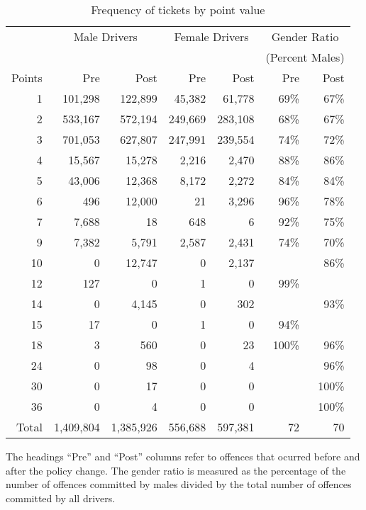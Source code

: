 
\begin{table}%
\centering
\begin{tabular}{r r r r r r r}
  \hline
		& \multicolumn{2}{c}{Male Drivers} 	&  \multicolumn{2}{c}{Female Drivers} &  \multicolumn{2}{c}{Gender Ratio} \\
 & & & & & \multicolumn{2}{c}{(Percent Males)} \\

 \cmidrule(lr){2-3}\cmidrule(lr){4-5}\cmidrule(lr){6-7} 
Points 	& Pre 		& Post		& Pre 		& Post		& Pre 		& Post		\\ 
  \hline
1 		& 101,298 	& 122,899	&  45,382 	&   61,778 	& 69\% 	& 67\% \\ 
2 		& 533,167 	& 572,194	& 249,669 	& 283,108 	& 68\% 	& 67\% \\ 
3 		& 701,053 	& 627,807	& 247,991	& 239,554	& 74\% 	& 72\% \\ 
4 		&  15,567 	&  15,278 	&    2,216 	&    2,470 	& 88\% 	& 86\% \\ 
5 		&  43,006 	&  12,368 	&    8,172 	&    2,272 	& 84\% 	& 84\% \\ 
6 		&     496 	&  12,000 	&        21 	&    3,296 	& 96\% 	& 78\% \\ 
7 		&   7,688 	&        18 	&      648 	&          6 	& 92\% 	& 75\% \\ 
9 		&   7,382 	&    5,791 	&    2,587 	&    2,431 	& 74\% 	& 70\% \\ 
10 		&         0 	&  12,747 	&         0 	&    2,137 	&  			& 86\% \\ 
12 		&     127	&         0 	&         1 	&         0 	& 99\% 	&  \\ 
14 		&       0 	&   4,145 	&         0 	&      302 	&  			& 93\% \\ 
15 		&      17 	&         0 	&         1 	&         0 	& 94\% 	&  \\ 
18 		&       3 	&      560 	&         0 	&        23 	& 100\% 	& 96\% \\ 
24 		&       0 	&       98 	&         0 	&         4 	&  			& 96\% \\ 
30 		&       0 	&       17 	&         0 	&         0 	&  			& 100\% \\ 
36 		&       0 	&        4 	&         0 	&         0 	&  			& 100\% \\ 

   \hline

Total 	  & 1,409,804 & 1,385,926 & 556,688 & 597,381 & 72 & 70 \\ 

   \hline
\end{tabular}
\caption{Frequency of tickets by point value} 
The headings ``Pre'' and ``Post'' columns refer to offences that ocurred before and after the policy change. 
The gender ratio is measured as the percentage of the number of offences committed by males 
divided by the total number of offences committed by all drivers. 
\label{tab:point_freq}
\end{table}
